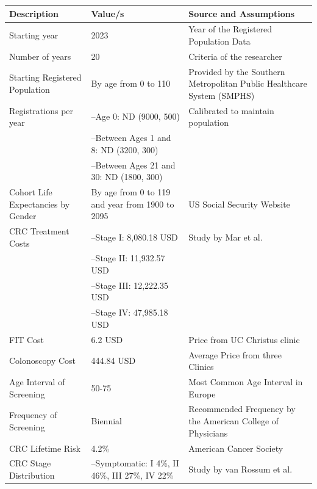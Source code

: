 \documentclass[sn-mathphys-num]{sn-jnl}%
\theoremstyle{thmstyleone}%
\theoremstyle{thmstyletwo}%
\theoremstyle{thmstylethree}%
\begin{document}
\begin{table}[h]
\centering
\begin{tabularx}{\textwidth}{|X|X|X|}
\hline
\textbf{Description}         & \textbf{Value/s}  & \textbf{Source and Assumptions} \\ \hline
Starting year       & 2023   & Year of the Registered Population Data \\ \hline
Number of years     & 20     & Criteria of the researcher \\ \hline
Starting Registered Population & By age from 0 to 110 & Provided by the Southern Metropolitan Public Healthcare System (SMPHS) \\ \hline
Registrations per year & --Age 0: ND (9000, 500) & Calibrated to maintain population \\
                       & --Between Ages 1 and 8: ND (3200, 300) & \\
                       & --Between Ages 21 and 30: ND (1800, 300) & \\ \hline
Cohort Life Expectancies by Gender & By age from 0 to 119 and year from 1900 to 2095 & US Social Security Website \cite{noauthor_social_2024} \\ \hline
CRC Treatment Costs & --Stage I: 8,080.18 USD & Study by Mar et al. \cite{mar_cost_2017} \\
                    & --Stage II: 11,932.57 USD & \\
                    & --Stage III: 12,222.35 USD & \\
                    & --Stage IV: 47,985.18 USD & \\ \hline
FIT Cost & 6.2 USD & Price from UC Christus clinic \cite{noauthor_aranceles_nodate-1} \\ \hline
Colonoscopy Cost & 444.84 USD & Average Price from three Clinics \cite{noauthor_aranceles_nodate,noauthor_aranceles_nodate-1,noauthor_aranceles_nodate-2} \\ \hline
Age Interval of Screening & 50-75 & Most Common Age Interval in Europe \cite{navarro_colorectal_2017} \\ \hline
Frequency of Screening & Biennial & Recommended Frequency by the American College of Physicians \cite{qaseem_screening_2019} \\ \hline
CRC Lifetime Risk & 4.2\% & American Cancer Society \cite{noauthor_colorectal_nodate-1} \\ \hline
CRC Stage Distribution & --Symptomatic: I 4\%, II 46\%, III 27\%, IV 22\% & Study by van Rossum et al. \cite{van_rossum_earlier_2009} \\

\end{tabularx}
\end{table}
\end{document}
